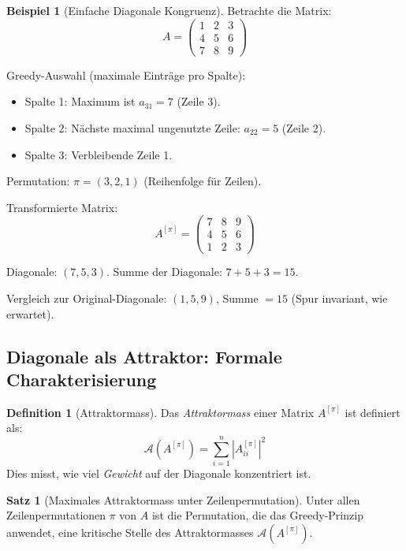 \documentclass[a4paper,12pt]{article}
\theoremstyle{definition}
\newtheorem{definition}{Definition}
\newtheorem{beispiel}{Beispiel}
\newtheorem{satz}{Satz}
\begin{document}
\begin{beispiel}[Einfache Diagonale Kongruenz]
	\label{bsp:diag-kongruenz-einfach}
	Betrachte die Matrix:
	\[
	A = \begin{pmatrix}
		1 & 2 & 3 \\
		4 & 5 & 6 \\
		7 & 8 & 9
	\end{pmatrix}
	\]
	
	Greedy-Auswahl (maximale Einträge pro Spalte):
	\begin{itemize}
		\item Spalte 1: Maximum ist $a_{31} = 7$ (Zeile 3).
		\item Spalte 2: Nächste maximal ungenutzte Zeile: $a_{22} = 5$ (Zeile 2).
		\item Spalte 3: Verbleibende Zeile 1.
	\end{itemize}
	
	Permutation: $\pi = (3, 2, 1)$ (Reihenfolge für Zeilen).
	
	Transformierte Matrix:
	\[
	A^{[\pi]} = \begin{pmatrix}
		7 & 8 & 9 \\
		4 & 5 & 6 \\
		1 & 2 & 3
	\end{pmatrix}
	\]
	
	Diagonale: $(7, 5, 3)$. Summe der Diagonale: $7 + 5 + 3 = 15$.
	
	Vergleich zur Original-Diagonale: $(1, 5, 9)$, Summe $= 15$ (Spur invariant, wie erwartet).
\end{beispiel}

\subsection{Diagonale als Attraktor: Formale Charakterisierung}

\begin{definition}[Attraktormass]
	Das \emph{Attraktormass} einer Matrix $A^{[\pi]}$ ist definiert als:
	\[
	\mathcal{A}(A^{[\pi]}) = \sum_{i=1}^n |A^{[\pi]}_{ii}|^2
	\]
	Dies misst, wie viel \emph{Gewicht} auf der Diagonale konzentriert ist.
\end{definition}

\begin{satz}[Maximales Attraktormass unter Zeilenpermutation]
	\label{satz:max-attraktor}
	Unter allen Zeilenpermutationen $\pi$ von $A$ ist die Permutation, die das Greedy-Prinzip anwendet, eine kritische Stelle des Attraktormasses $\mathcal{A}(A^{[\pi]})$.
\end{satz}
\end{document}
